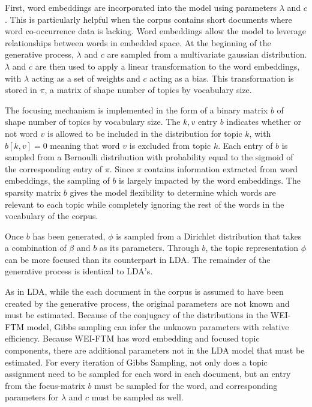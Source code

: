 \documentclass[letterpaper, 11pt]{article}
\begin{document}
\begin{multicols}{2}
First, word embeddings are incorporated into the model using parameters $\lambda$ and $c$.
This is particularly helpful when the corpus contains short documents where word co-occurrence data
is lacking.
Word embeddings allow the model to leverage relationships between words in embedded space.
At the beginning of the generative process, $\lambda$ and $c$ are sampled from a multivariate
gaussian distribution.
$\lambda$ and $c$ are then used to apply a linear transformation to the word embeddings, with
$\lambda$ acting as a set of weights and $c$ acting as a bias.
This transformation is stored in $\pi$, a matrix of shape number of topics by vocabulary size.

The focusing mechanism is implemented in the form of a binary matrix $b$ of shape number of topics
by vocabulary size.
The $k, v$ entry $b$ indicates whether or not word $v$ is allowed to be included in the distribution
for topic $k$, with $b[k, v] = 0$ meaning that word $v$ is excluded from topic $k$.
Each entry of $b$ is sampled from a Bernoulli distribution with probability equal to the sigmoid of
the corresponding entry of $\pi$.
Since $\pi$ contains information extracted from word embeddings, the sampling of $b$ is largely
impacted by the word embeddings.
The sparsity matrix $b$ gives the model flexibility to determine which words are relevant to each
topic while completely ignoring the rest of the words in the vocabulary of the corpus.

Once $b$ has been generated, $\phi$ is sampled from a Dirichlet distribution that takes a
combination of $\beta$ and $b$ as its parameters.
Through $b$, the topic representation $\phi$ can be more focused than its counterpart in LDA.
The remainder of the generative process is identical to LDA’s.

As in LDA, while the each document in the corpus is assumed to have been created by the generative
process, the original parameters are not known and must be estimated.
Because of the conjugacy of the distributions in the WEI-FTM model, Gibbs sampling can infer the
unknown parameters with relative efficiency.
Because WEI-FTM has word embedding and focused topic components, there are additional parameters
not in the LDA model that must be estimated.
For every iteration of Gibbs Sampling, not only does a topic assignment need to be sampled for each
word in each document, but an entry from the focus-matrix $b$ must be sampled for the word, and
corresponding parameters for $\lambda$ and $c$ must be sampled as well.



\end{multicols}
\end{document}
